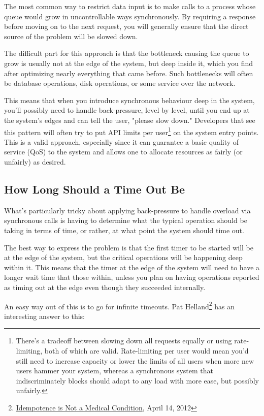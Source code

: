 The most common way to restrict data input is to make calls to a process whose queue would grow in uncontrollable ways synchronously. By requiring a response before moving on to the next request, you will generally ensure that the direct source of the problem will be slowed down.

The difficult part for this approach is that the bottleneck causing the queue to grow is usually not at the edge of the system, but deep inside it, which you find after optimizing nearly everything that came before. Such bottlenecks will often be database operations, disk operations, or some service over the network.

This means that when you introduce synchronous behaviour deep in the system, you'll possibly need to handle back-pressure, level by level, until you end up at the system's edges and can tell the user, "please slow down."
Developers that see this pattern will often try to put API limits per user\footnote{There's a tradeoff between slowing down all requests equally or using rate-limiting, both of which are valid. Rate-limiting per user would mean you'd still need to increase capacity or lower the limits of all users when more new users hammer your system, whereas a synchronous system that indiscriminately blocks should adapt to any load with more ease, but possibly unfairly.} on the system entry points. This is a valid approach, especially since it can guarantee a basic quality of service (QoS) to the system and allows one to allocate resources as fairly (or unfairly) as desired.

\subsection{How Long Should a Time Out Be}

What's particularly tricky about applying back-pressure to handle overload via synchronous calls is having to determine what the typical operation should be taking in terms of time, or rather, at what point the system should time out.

The best way to express the problem is that the first timer to be started will be at the edge of the system, but the critical operations will be happening deep within it. This means that the timer at the edge of the system will need to have a longer wait time that those within, unless you plan on having operations reported as timing out at the edge even though they succeeded internally.

An easy way out of this is to go for infinite timeouts. Pat Helland\footnote{\href{http://queue.acm.org/detail.cfm?id=2187821}{Idempotence is Not a Medical Condition}, April 14, 2012} has an interesting answer to this:

